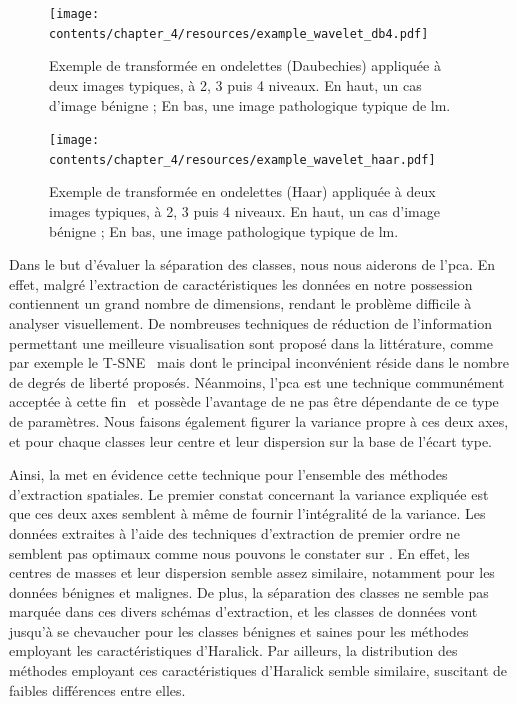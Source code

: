 \begin{figure}[H]
    \centering
    \texttt{[image: contents/chapter\_4/resources/example\_wavelet\_db4.pdf]}
    \caption{Exemple de transformée en ondelettes (Daubechies) appliquée à deux images typiques, à 2, 3 puis 4 niveaux. En haut, un cas d'image bénigne ; En bas, une image pathologique typique de \gls{lm}.}
    \label{fig:example_wavelet_db4}
\end{figure}\par

\begin{figure}[H]
    \centering
    \texttt{[image: contents/chapter\_4/resources/example\_wavelet\_haar.pdf]}
    \caption{Exemple de transformée en ondelettes (Haar) appliquée à deux images typiques, à 2, 3 puis 4 niveaux. En haut, un cas d'image bénigne ; En bas, une image pathologique typique de \gls{lm}.}
    \label{fig:example_wavelet_haar}
\end{figure}\par

Dans le but d'évaluer la séparation des classes, nous nous aiderons de l'\gls{pca}. En effet, malgré l'extraction de caractéristiques les données en notre possession contiennent un grand nombre de dimensions, rendant le problème difficile à analyser visuellement. De nombreuses techniques de réduction de l'information permettant une meilleure visualisation sont proposé dans la littérature, comme par exemple le T-SNE~\cite{Maaten2008} mais dont le principal inconvénient réside dans le nombre de degrés de liberté proposés. Néanmoins, l'\gls{pca} est une technique communément acceptée à cette fin~\cite{Himberg2001} et possède l'avantage de ne pas être dépendante de ce type de paramètres. Nous faisons également figurer la variance propre à ces deux axes, et pour chaque classes leur centre et leur dispersion sur la base de l'écart type.\par

Ainsi, la  met en évidence cette technique pour l'ensemble des méthodes d'extraction spatiales. Le premier constat concernant la variance expliquée est que ces deux axes semblent à même de fournir l'intégralité de la variance. Les données extraites à l'aide des techniques d'extraction de premier ordre ne semblent pas optimaux comme nous pouvons le constater sur . En effet, les centres de masses et leur dispersion semble assez similaire, notamment pour les données bénignes et malignes. De plus, la séparation des classes ne semble pas marquée dans ces divers schémas d'extraction, et les classes de données vont jusqu'à se chevaucher pour les classes bénignes et saines pour les méthodes employant les caractéristiques d'Haralick. Par ailleurs, la distribution des méthodes employant ces caractéristiques d'Haralick semble similaire, suscitant de faibles différences entre elles.\par

